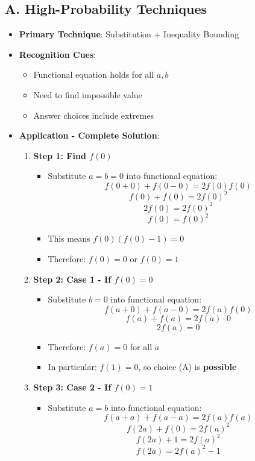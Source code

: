 \documentclass[12pt]{article}
\begin{document}
\begin{techniquesbox}
\subsection*{A. High-Probability Techniques}
\begin{itemize}[leftmargin=*]
    \item \textbf{Primary Technique}: Substitution + Inequality Bounding
    \item \textbf{Recognition Cues}: 
    \begin{itemize}
        \item Functional equation holds for all $a, b$
        \item Need to find impossible value
        \item Answer choices include extremes
    \end{itemize}
    \item \textbf{Application - Complete Solution}: 
    \begin{enumerate}
        \item \textbf{Step 1: Find $f(0)$}
        \begin{itemize}
            \item Substitute $a = b = 0$ into functional equation:
            \[f(0 + 0) + f(0 - 0) = 2f(0)f(0)\]
            \[f(0) + f(0) = 2f(0)^2\]
            \[2f(0) = 2f(0)^2\]
            \[f(0) = f(0)^2\]
            \item This means $f(0)(f(0) - 1) = 0$
            \item Therefore: $f(0) = 0$ or $f(0) = 1$
        \end{itemize}
        
        \item \textbf{Step 2: Case 1 - If $f(0) = 0$}
        \begin{itemize}
            \item Substitute $b = 0$ into functional equation:
            \[f(a + 0) + f(a - 0) = 2f(a)f(0)\]
            \[f(a) + f(a) = 2f(a) \cdot 0\]
            \[2f(a) = 0\]
            \item Therefore: $f(a) = 0$ for all $a$
            \item In particular: $f(1) = 0$, so choice (A) is \textbf{possible}
        \end{itemize}
        
        \item \textbf{Step 3: Case 2 - If $f(0) = 1$}
        \begin{itemize}
            \item Substitute $a = b$ into functional equation:
            \[f(a + a) + f(a - a) = 2f(a)f(a)\]
            \[f(2a) + f(0) = 2f(a)^2\]
            \[f(2a) + 1 = 2f(a)^2\]
            \[f(2a) = 2f(a)^2 - 1\]
        \end{itemize}
        

\end{enumerate}
\end{itemize}
\end{techniquesbox}
\end{document}
